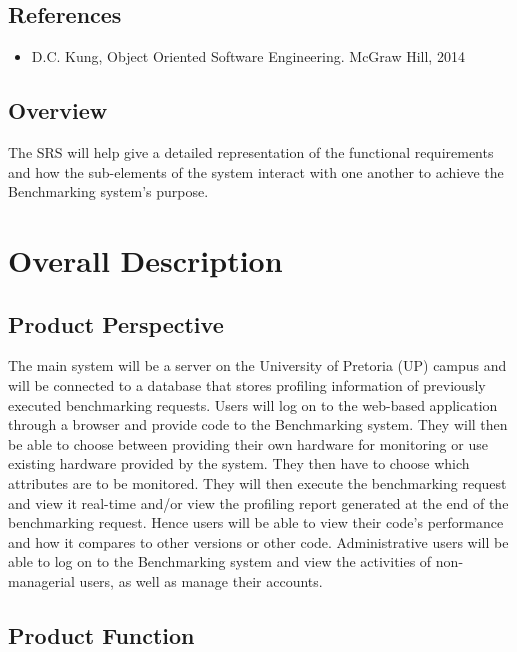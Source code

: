 \documentclass{article}
\begin{document}
	\subsection{References}
        	\begin{itemize}
        		\item D.C. Kung, Object Oriented Software Engineering. McGraw Hill, 2014
        	\end{itemize}
	\subsection{Overview}
	The SRS will help give a detailed representation of the functional requirements and how the sub-elements of the system interact with one another to achieve the Benchmarking system's purpose.

	\section{Overall Description}
    	
	\subsection{Product Perspective}
    The main system will be a server on the University of Pretoria (UP) campus and will be connected to a database that stores profiling information of previously executed benchmarking requests. Users will log on to the web-based application through a browser and provide code to the Benchmarking system. They will then be able to choose between providing their own hardware for monitoring or use existing hardware provided by the system. They then have to choose which attributes are to be monitored. They will then execute the benchmarking request and view it real-time and/or view the profiling report generated at the end of the benchmarking request. Hence users will be able to view their code's performance and how it compares to other versions or other code. Administrative users will be able to log on to the Benchmarking system and view the activities of non-managerial users, as well as manage their accounts.   
	\subsection{Product Function}
    
\end{document}
